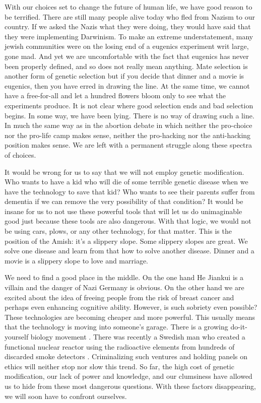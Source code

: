 With our choices set to change the future of human life, we have good reason to be terrified.
There are still many people alive today who fled from Nazism to our country.
If we asked the Nazis what they were doing, they would have said that they were implementing Darwinism.
To make an extreme understatement, many jewish communities were on the losing end of a eugenics experiment writ large, gone mad.
And yet we are uncomfortable with the fact that eugenics has never been properly defined, and so does not really mean anything.
Mate selection is another form of genetic selection but if you decide that dinner and a movie is eugenics, then you have erred in drawing the line.
At the same time, we cannot have a free-for-all and let a hundred flowers bloom only to see what the experiments produce.
It is not clear where good selection ends and bad selection begins.
In some way, we have been lying.
There is no way of drawing such a line.
In much the same way as in the abortion debate in which neither the pro-choice nor the pro-life camp makes sense, neither the pro-hacking nor the anti-hacking position makes sense.
We are left with a permanent struggle along these spectra of choices.

It would be wrong for us to say that we will not employ genetic modification.
Who wants to have a kid who will die of some terrible genetic disease when we have the technology to save that kid?
Who wants to see their parents suffer from dementia if we can remove the very possibility of that condition?
It would be insane for us to not use these powerful tools that will let us do unimaginable good just because these tools are also dangerous.
With that logic, we would not be using cars, plows, or any other technology, for that matter.
This is the position of the Amish: it's a slippery slope.
Some slippery slopes are great.
We solve one disease and learn from that how to solve another disease.
Dinner and a movie is a slippery slope to love and marriage.

We need to find a good place in the middle.
On the one hand He Jiankui is a villain and the danger of Nazi Germany is obvious.
On the other hand we are excited about the idea of freeing people from the risk of breast cancer and perhaps even enhancing cognitive ability.
However, is such sobriety even possible?
These technologies are becoming cheaper and more powerful.
This usually means that the technology is moving into someone's garage.
There is a growing do-it-yourself biology movement \cite{Kolodziejczyk2017}.
There was recently a Swedish man who created a functional nuclear reactor using the radioactive elements from hundreds of discarded smoke detectors \cite{Taylor2011}.
Criminalizing such ventures and holding panels on ethics will neither stop nor slow this trend.
So far, the high cost of genetic modification, our lack of power and knowledge, and our clumsiness have allowed us to hide from these most dangerous questions.
With these factors disappearing, we will soon have to confront ourselves.

